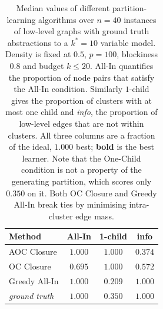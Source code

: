 \begin{table}[t]
\centering
\footnotesize
\begin{tabular}{@{}lccc@{}}
\toprule
Method & All-In & 1-child & info \\
\midrule
AOC Closure & $\mathbf{1.000}$ & $\mathbf{1.000}$ & $0.374$ \\
OC Closure & $0.695$ & $\mathbf{1.000}$ & $0.572$ \\
Greedy All-In & $\mathbf{1.000}$ & $0.209$ & $\mathbf{1.000}$ \\
\midrule
\textit{ground truth} & $1.000$ & $0.350$ & $1.000$ \\
\bottomrule
\end{tabular}
\caption{Median values of different partition-learning algorithms over $n=40$ instances of low-level graphs with ground truth abstractions to a $k^{*}=10$ variable model. Density is fixed at $0.5$, $p=100$, blockiness $0.8$ and budget $k\leq20$. All-In quantifies the proportion of node pairs that satisfy the All-In condition. Similarly $1$-child gives the proportion of clusters with at most one child and \textit{info}, the proportion of low-level edges that are not within clusters. All three columns are a fraction of the ideal, $1.000$ best; \textbf{bold} is the best learner. Note that the One-Child condition is not a property of the generating partition, which scores only $0.350$ on it. Both OC Closure and Greedy All-In break ties by minimising intra-cluster edge mass.}
\label{tab:partition}
\end{table}
